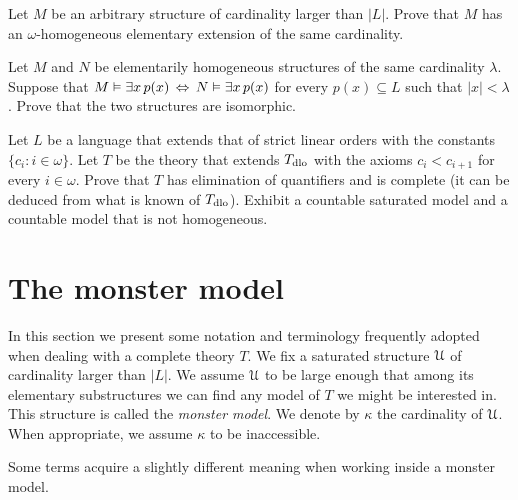 \documentclass[creche.tex]{subfiles}
\begin{document}
\begin{exercise}\label{ex_omega_homogeneous_same_card}
Let $M$ be an arbitrary structure of cardinality larger than $|L|$. Prove that $M$ has an $\omega\mbox{-}$homogeneous elementary extension of the same cardinality.\QED 
\end{exercise}

\begin{exercise}
Let $M$ and $N$ be elementarily homogeneous structures of the same cardinality $\lambda$. Suppose that $M\vDash\exists x\, p(x)\,\Leftrightarrow\,N\vDash\exists x\, p(x)$ for every $p(x)\subseteq L$ such that $|x|<\lambda$. Prove that the two structures are isomorphic.\QED 
\end{exercise}

\begin{exercise}\label{vaughtesempio}
Let $L$ be a language that extends that of strict linear orders with the constants $\{c_i: i\in\omega\}$. Let $T$ be the theory that extends $T_{\rm dlo}$ with the axioms $c_i<c_{i+1}$ for every  $i\in\omega$. Prove that $T$ has elimination of quantifiers and is complete (it can be deduced from what is known of $T_{\rm dlo}$). Exhibit a countable saturated model and a countable model that is not homogeneous.\QED 
\end{exercise}

\section{The monster model}\label{monster}

\label{compattezzasaturazione}


In this section we present some notation and terminology frequently adopted when dealing with a complete theory $T$.
We fix a saturated structure $\EuScript U$ of cardinality larger than $|L|$.
We assume $\EuScript U$ to be large enough that among its elementary substructures we can find any model of $T$ we might be interested in.
This structure is called the \emph{monster model}.
We denote by $\kappa$ the cardinality of $\EuScript U$.
When appropriate, we assume $\kappa$ to be inaccessible. 

Some terms acquire a slightly different meaning when working inside a monster model.


\newcommand{\labellalunga}[1]{#1\hfill}
\newenvironment{litemize}[1]
   {\begin{list}{}{
   \setlength{\parskip}{0mm}
   \setlength{\topsep}{5mm}
   \setlength{\partopsep}{0mm}
   \setlength{\rightmargin}{0mm}
   \setlength{\listparindent}{0mm}
   \setlength{\itemindent}{0mm}
   \setlength{\itemsep}{3mm}
   \settowidth{\labelwidth}{#1}
   \setlength{\parsep}{0mm}
   \setlength{\partopsep}{0mm}
   \setlength{\labelsep}{3mm}
   \setlength{\leftmargin}{\labelwidth+\labelsep}
   \let\makelabel\labellalunga}}{
   \end{list}}
\end{document}
